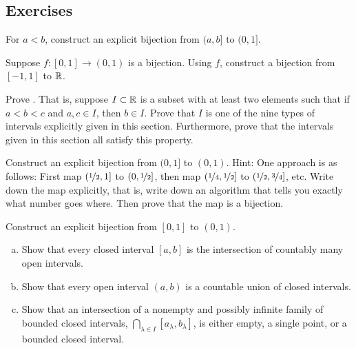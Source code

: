 \subsection{Exercises}

\begin{exercise}
For $a < b$, construct an explicit bijection from $(a,b]$ to $(0,1]$.
\end{exercise}

\begin{exercise}
Suppose $f \colon [0,1] \to (0,1)$ is a bijection.
Using $f$, construct a
bijection from $[-1,1]$ to ${\mathbb{R}}$.
\end{exercise}

\begin{exercise} \label{exercise:intervaldef}
Prove .
That is,
suppose $I \subset {\mathbb{R}}$ is a subset with at least two elements
such that if $a < b < c$ and $a, c \in I$, then $b \in I$.
Prove that $I$ is one of the nine types of intervals explicitly
given in this section.
Furthermore, prove that the intervals given in this section
all satisfy this property.
\end{exercise}

\begin{exercise}[Hard]
Construct an explicit bijection from $(0,1]$ to $(0,1)$.
Hint: One approach is as follows: First map $(\nicefrac{1}{2},1]$
to $(0,\nicefrac{1}{2}]$, then map
$(\nicefrac{1}{4},\nicefrac{1}{2}]$
to $(\nicefrac{1}{2},\nicefrac{3}{4}]$, etc.
Write down the map explicitly, that
is, write down an algorithm that tells you exactly what number goes where.
Then prove that the map is a bijection.
\end{exercise}

\begin{exercise}[Hard]
Construct an explicit bijection from $[0,1]$ to $(0,1)$.
\end{exercise}

\begin{exercise}
\leavevmode
\begin{enumerate}[a)]
\item
Show that every closed interval $[a,b]$ is the intersection
of countably many open intervals.
\item
Show that every open interval $(a,b)$
is a countable union of closed intervals.
\item
Show that an intersection
of a nonempty and possibly infinite family of bounded closed intervals,
$\bigcap\limits_{\lambda \in I} [a_\lambda,b_\lambda]$,
is either empty, a single point,
or a bounded closed interval.
\end{enumerate}
\end{exercise}

